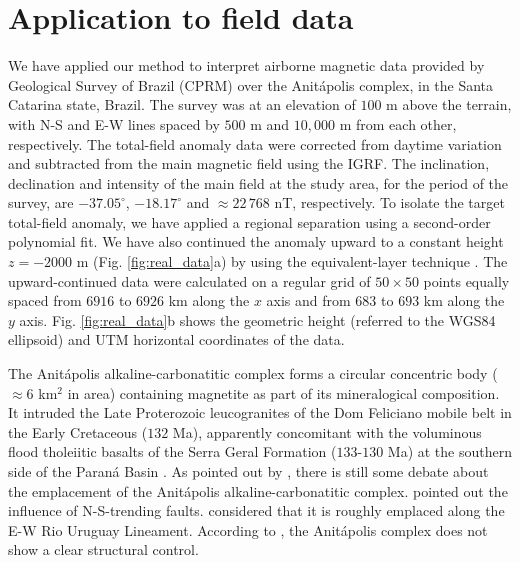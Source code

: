 \section{Application to field data}

We have applied our method to interpret airborne magnetic data provided by 
Geological Survey of Brazil (CPRM) over the Anit{\'a}polis complex, 
in the Santa Catarina state, Brazil. 
The survey was at an elevation of $100$ m above the terrain, 
with N-S and E-W lines spaced by $500$ m and $10,000$ m from each other, respectively. 
The total-field anomaly data were corrected from daytime variation and 
subtracted from the main magnetic field using the IGRF. 
The inclination, declination and intensity of the main field at the study area, 
for the period of the survey, are $-37.05^{\circ}$, $-18.17^{\circ}$ and 
$\approx 22 \, 768 $ nT, respectively.
To isolate the target total-field anomaly, we have applied 
a regional separation using a second-order polynomial fit. We have also continued 
the anomaly upward to a constant height $z=-2000$ m (Fig. \ref{fig:real_data}a) by 
using the equivalent-layer technique \citep{dampney1969,emilia1973,oliveirajr-barbosa2013}. 
The upward-continued data were calculated on a regular grid of $50 \times 50$ points 
equally spaced from $6916$ to $6926$ km along the $x$ axis and from 
$683$ to $693$ km along the $y$ axis. 
Fig. \ref{fig:real_data}b shows the geometric height (referred to the WGS84 ellipsoid) 
and UTM horizontal coordinates of the data.

The Anit{\'a}polis alkaline-carbonatitic complex forms a circular concentric body 
($\approx 6$ km$^{2}$ in area) containing magnetite as part of its mineralogical 
composition. It intruded the Late Proterozoic leucogranites of the Dom Feliciano 
mobile belt in the Early Cretaceous ($132$ Ma), apparently concomitant with the 
voluminous flood tholeiitic basalts of the Serra Geral Formation ($133$-$130$ Ma) 
at the southern side of the Paran{\'a} Basin \citep{gibson-1999, scheibe-etal2005}.
As pointed out by \citet{GOMES2018}, there is still some debate about the emplacement 
of the Anit{\'a}polis alkaline-carbonatitic complex. 
\citet{melcher-coutinho1966} pointed out the influence of N-S-trending faults. 
\citet{scheibe-etal2005} considered that it is roughly emplaced along the E-W Rio 
Uruguay Lineament. According to \citet{riccomini-etal2005}, the Anit{\'a}polis 
complex does not show a clear structural control. 

